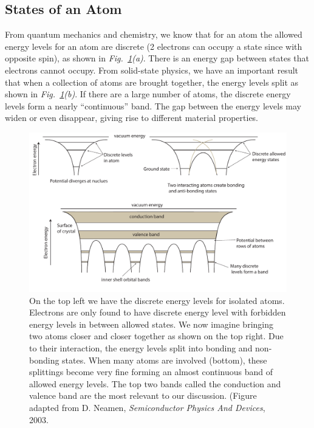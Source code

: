 \subsection{States of an Atom}
From quantum mechanics and chemistry,  we know that for an atom the allowed energy levels for an atom are discrete (2 electrons can occupy a state since with opposite spin), as shown in \emph{Fig.~\ref{fig:slide23}(a)}.  There is an energy gap between states that electrons cannot occupy.  From solid-state physics, we have an important result that when a collection of atoms are brought together, the energy levels split as shown in \emph{Fig.~\ref{fig:slide23}(b)}.  If there are a large number of atoms, the discrete energy levels form a nearly “continuous” band.   The gap between the energy levels may widen or even disappear, giving rise to different material properties.
\begin{figure}
\centering
\includegraphics[width=\columnwidth]{banddiagram_atoms.pdf}
\caption{On the top left we have the discrete energy levels for isolated atoms.  Electrons are only found to have discrete energy level with forbidden energy levels in between allowed states.  We now imagine bringing two atoms closer and closer together as shown on the top right.  Due to their interaction, the energy levels split into bonding and non-bonding states.  When many atoms are involved (bottom), these splittings become very fine forming an almost continuous band of allowed energy levels.  The top two bands called the conduction and valence band are the most relevant to our discussion.  (Figure adapted from D. Neamen, \emph{Semiconductor Physics And Devices}, 2003. \cite{neamen}}
\label{fig:slide23}
\end{figure}
